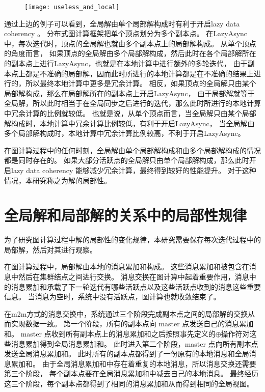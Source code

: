 \begin{figure}[!htbp]
\centering
\texttt{[image: useless\_and\_local]}
\label{fig:useless_and_local}
\end{figure}


通过上边的例子可以看到，全局解由单个局部解构成时有利于开启lazy data coherency 。
分布式图计算框架把单个顶点划分为多个副本点。
在LazyAsync中，每次迭代时，顶点的全局解也就由多个副本点上的局部解构成。
从单个顶点的角度而言，
如果顶点的全局解由多个局部解构成，然后此时在各个局部解所在的副本点上进行LazyAsync，也就是在本地计算中进行额外的多轮迭代，
由于副本点上都是不准确的局部解，因而此时所进行的本地计算都是在不准确的结果上进行的，所以最终本地计算中更多是冗余计算。
相反，如果顶点的全局解只由某个局部解构成，那么在局部解所在的副本点上开启LazyAsync，
由于局部解就等于全局解，所以此时相当于在全局同步之后进行的迭代，那么此时所进行的本地计算中冗余计算的比例就较低。
也就是说，从单个顶点而言，当全局解只由某个局部解构成时，本地计算中冗余计算比例较低，有利于开启LazyAsync，
当全局解由多个局部解构成时，本地计算中冗余计算比例较高，不利于开启LazyAsync。

在图计算过程中的任何时刻，全局解由单个局部解构成和由多个局部解构成的情况都是同时存在的。
如果大部分活跃点的全局解只由单个局部解构成，那么此时开启lazy data coherency 能够减少冗余计算，最终得到较好的性能提升。
对于这种情况，本研究称之为解的局部性。

\section{全局解和局部解的关系中的局部性规律}
为了研究图计算过程中解的局部性的变化规律，本研究需要保存每次迭代过程中的局部解，然后对其进行观察。

在图计算过程中，局部解由本地的消息累加和构成。
这些消息累加和被包含在消息中然后在集群结点之间进行交换。
消息交换在图计算中起着重要作用，消息中的消息累加和承载了下一轮迭代有哪些活跃点以及这些活跃点收到的消息这些重要信息。
当消息为空时，系统中没有活跃点，图计算也就收敛结束了。

在m2m方式的消息交换中，系统通过三个阶段完成副本点之间的局部解的交换从而实现数据一致。
第一个阶段，所有的副本点向 master 点发送自己的消息累加和。
master 点收到所有副本点上的消息累加和之后按照事先定义的$\oplus$操作符对这些消息累加得到全局消息累加和。
此时进入第二个阶段，master 点向所有副本点发送全局消息累加和。
此时所有的副本点都得到了一份原有的本地消息和全局消息累加和。
由于全局消息累加和中存在着重复的本地消息，所以消息交换还需要第三个阶段，
每个副本点要在全局消息累加和中减去自己的本地消息。
最终经历这三个阶段，每个副本点都得到了相同的消息累加和从而得到相同的全局视图。


